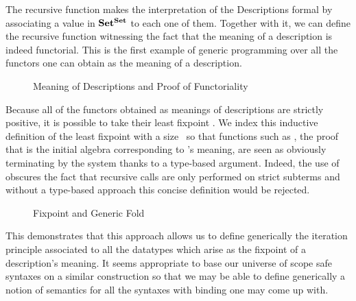 The recursive function  makes the interpretation of the
Descriptions formal by associating a value in $\mathbf{Set}{}^{\mathbf{Set}}{}$ to
each one of them. Together with it, we can define the 
recursive function witnessing the fact that the meaning of a
description is indeed functorial. This is the first example of
generic programming over all the functors one can obtain as the
meaning of a description.

\begin{figure}[h]
\begin{minipage}{0.35\textwidth}
\end{minipage}\hspace{2em}
\begin{minipage}{0.55\textwidth}
\end{minipage}
\caption{Meaning of Descriptions and Proof of Functoriality}
\end{figure}

Because all of the functors obtained as meanings of descriptions are
strictly positive, it is possible to take their least fixpoint .
We index this inductive definition of the least fixpoint with a
size~\cite{DBLP:journals/corr/abs-1012-4896} so that functions such
as , the proof that   is the initial algebra
corresponding to 's meaning, are seen as obviously terminating
by the system thanks to a type-based argument. Indeed, the use of
 obscures the fact that recursive calls are only performed
on strict subterms and without a type-based approach this concise
definition would be rejected.

\begin{figure}[h]
\begin{minipage}{0.45\textwidth}
\end{minipage}\hspace{2em}
\begin{minipage}{0.45\textwidth}
\end{minipage}
\caption{Fixpoint and Generic Fold}
\end{figure}

This demonstrates that this approach allows us to define generically
the iteration principle associated to all the datatypes which arise
as the fixpoint of a description's meaning. It seems appropriate to
base our universe of scope safe syntaxes on a similar construction
so that we may be able to define generically a notion of semantics
for all the syntaxes with binding one may come up with.

